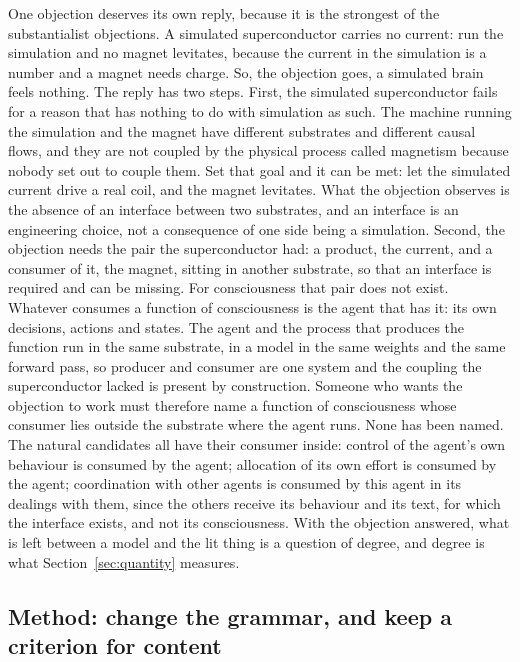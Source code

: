 One objection deserves its own reply, because it is the strongest of the substantialist objections. A
simulated superconductor carries no current: run the simulation and no magnet levitates, because the
current in the simulation is a number and a magnet needs charge. So, the objection goes, a simulated
brain feels nothing. The reply has two steps. First, the simulated superconductor fails for a reason
that has nothing to do with simulation as such. The machine running the simulation and the magnet have
different substrates and different causal flows, and they are not coupled by the physical process
called magnetism because nobody set out to couple them. Set that goal and it can be met: let the
simulated current drive a real coil, and the magnet levitates. What the objection observes is the
absence of an interface between two substrates, and an interface is an engineering choice, not a
consequence of one side being a simulation. Second, the objection needs the pair the superconductor
had: a product, the current, and a consumer of it, the magnet, sitting in another substrate, so that
an interface is required and can be missing. For consciousness that pair does not exist. Whatever
consumes a function of consciousness is the agent that has it: its own decisions, actions and states.
The agent and the process that produces the function run in the same substrate, in a model in the
same weights and the same forward pass, so producer and consumer are one system and the coupling the
superconductor lacked is present by construction. Someone who wants the objection to work must
therefore name a function of consciousness whose consumer lies outside the substrate where the agent
runs. None has been named. The natural candidates all have their consumer inside: control of the
agent's own behaviour is consumed by the agent; allocation of its own effort is consumed by the agent;
coordination with other agents is consumed by this agent in its dealings with them, since the others
receive its behaviour and its text, for which the interface exists, and not its consciousness. With
the objection answered, what is left between a model and the lit thing is a question of degree, and
degree is what Section~\ref{sec:quantity} measures.

\subsection{Method: change the grammar, and keep a criterion for content}
\label{sec:grammar}
\label{sec:precedent}
\label{sec:criterion}

